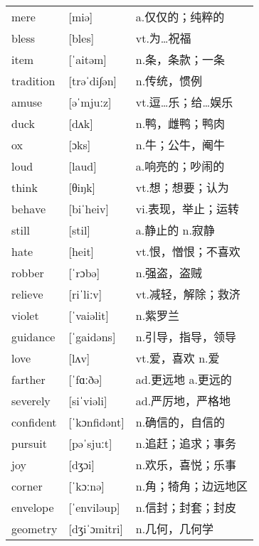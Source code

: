 \documentclass[a4paper]{article}
\begin{document}
\section{}
\begin{tabular}{l l l}

mere & [miə] & a.仅仅的；纯粹的 \\
bless & [bles] & vt.为…祝福 \\
item & [ˈaitəm] & n.条，条款；一条 \\
tradition & [trəˈdi∫ən] & n.传统，惯例 \\
amuse & [əˈmjuːz] & vt.逗…乐；给…娱乐 \\
duck & [dʌk] & n.鸭，雌鸭；鸭肉 \\
ox & [ɔks] & n.牛；公牛，阉牛 \\
loud & [laud] & a.响亮的；吵闹的 \\
think & [θiŋk] & vt.想；想要；认为 \\
behave & [biˈheiv] & vi.表现，举止；运转 \\
still & [stil] & a.静止的 n.寂静 \\
hate & [heit] & vt.恨，憎恨；不喜欢 \\
robber & [ˈrɔbə] & n.强盗，盗贼 \\
relieve & [riˈliːv] & vt.减轻，解除；救济 \\
violet & [ˈvaiəlit] & n.紫罗兰 \\
guidance & [ˈgaidəns] & n.引导，指导，领导 \\
love & [lʌv] & vt.爱，喜欢 n.爱 \\
farther & [ˈfɑːðə] & ad.更远地 a.更远的 \\
severely & [siˈviəli] & ad.严厉地，严格地 \\
confident & [ˈkɔnfidənt] & n.确信的，自信的 \\
pursuit & [pəˈsjuːt] & n.追赶；追求；事务 \\
joy & [dʒɔi] & n.欢乐，喜悦；乐事 \\
corner & [ˈkɔːnə] & n.角；犄角；边远地区 \\
envelope & [ˈenviləup] & n.信封；封套；封皮 \\
geometry & [dʒiˈɔmitri] & n.几何，几何学 \\

\end{tabular}
\end{document}
